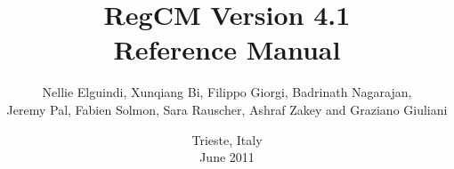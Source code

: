 \documentclass{article}
\begin{document}
\title{RegCM Version 4.1\\ Reference Manual\vspace{-0.10in}
}

\author{Nellie Elguindi, Xunqiang Bi, Filippo Giorgi, Badrinath Nagarajan,\\ 
Jeremy Pal, Fabien Solmon, Sara Rauscher, Ashraf Zakey and Graziano Giuliani}

\date{Trieste, Italy\\June 2011}

\maketitle



\newpage
\tableofcontents
\newpage
\listoffigures
\listoftables
\newpage


%
%
%



%
%
\end{document}
